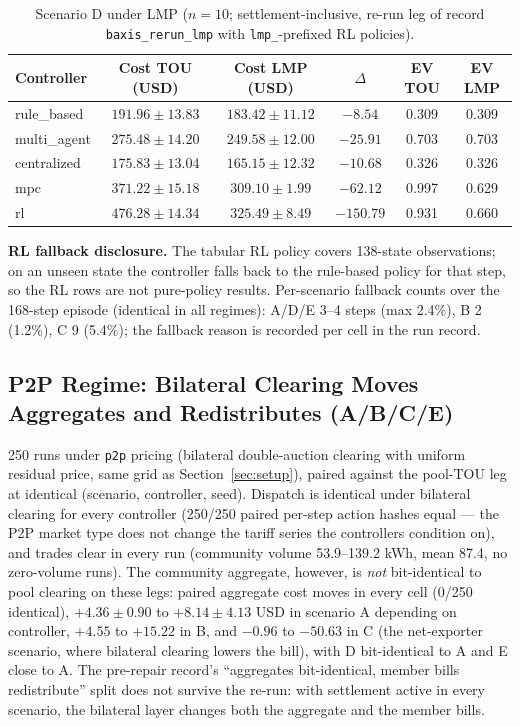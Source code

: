\documentclass[11pt,a4paper]{article}
\begin{document}
\begin{table}[htbp]
\centering
\caption{Scenario D under LMP ($n{=}10$; settlement-inclusive, re-run leg of record \texttt{baxis\_rerun\_lmp} with \texttt{lmp\_}-prefixed RL policies).}
\label{tab:d-lmp}
\begin{tabular}{lccccc}
\toprule
Controller & Cost TOU (USD) & Cost LMP (USD) & $\Delta$ & EV TOU & EV LMP \\
\midrule
rule\_based & $191.96 \pm 13.83$ & $183.42 \pm 11.12$ & $-8.54$ & 0.309 & 0.309 \\
multi\_agent & $275.48 \pm 14.20$ & $249.58 \pm 12.00$ & $-25.91$ & 0.703 & 0.703 \\
centralized & $175.83 \pm 13.04$ & $165.15 \pm 12.32$ & $-10.68$ & 0.326 & 0.326 \\
mpc & $371.22 \pm 15.18$ & $309.10 \pm 1.99$ & $-62.12$ & 0.997 & 0.629 \\
rl & $476.28 \pm 14.34$ & $325.49 \pm 8.49$ & $-150.79$ & 0.931 & 0.660 \\
\bottomrule
\end{tabular}
\end{table}

\textbf{RL fallback disclosure.} The tabular RL policy covers 138-state
observations; on an unseen state the controller falls back to the rule-based
policy for that step, so the RL rows are not pure-policy results. Per-scenario
fallback counts over the 168-step episode (identical in all regimes): A/D/E
3--4 steps (max 2.4\%), B 2 (1.2\%), C 9 (5.4\%); the fallback reason is
recorded per cell in the run record.

\subsection{P2P Regime: Bilateral Clearing Moves Aggregates and Redistributes (A/B/C/E)}
\label{sec:p2p}

250 runs under \texttt{p2p} pricing (bilateral double-auction clearing with
uniform residual price, same grid as Section~\ref{sec:setup}), paired against
the pool-TOU leg at identical (scenario, controller, seed). Dispatch is
identical under bilateral clearing for every controller (250/250 paired
per-step action hashes equal --- the P2P market type does not change the
tariff series the controllers condition on), and trades clear in every run
(community volume 53.9--139.2 kWh, mean 87.4, no zero-volume runs). The
community aggregate, however, is \emph{not} bit-identical to pool clearing on
these legs: paired aggregate cost moves in every cell (0/250 identical),
$+4.36 \pm 0.90$ to $+8.14 \pm 4.13$ USD in scenario A depending on
controller, $+4.55$ to $+15.22$ in B, and $-0.96$ to $-50.63$ in C (the
net-exporter scenario, where bilateral clearing lowers the bill), with D
bit-identical to A and E close to A. The pre-repair record's
``aggregates bit-identical, member bills redistribute'' split does not
survive the re-run: with settlement active in every scenario, the bilateral
layer changes both the aggregate and the member bills.
\end{document}
